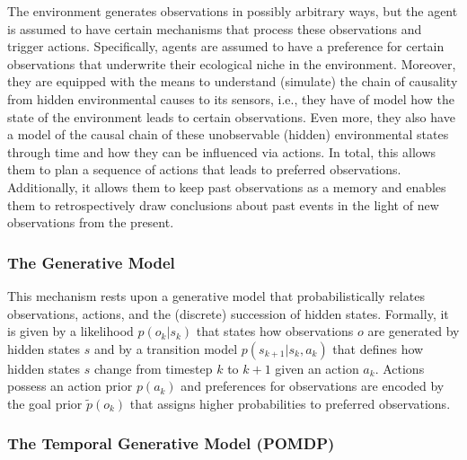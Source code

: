 The environment generates observations in possibly arbitrary ways, but the agent is assumed to have certain mechanisms that process these observations and trigger actions. Specifically, agents are assumed to have a preference for certain observations that underwrite their ecological niche in the environment. Moreover, they are equipped with the means to understand (simulate) the chain of causality from hidden environmental causes to its sensors, i.e., they have of model how the state of the environment leads to certain observations. Even more, they also have a model of the causal chain of these unobservable (hidden) environmental states through time and how they can be influenced via actions. In total, this allows them to plan a sequence of actions that leads to preferred observations. Additionally, it allows them to keep past observations as a memory and enables them to retrospectively draw conclusions about past events in the light of new observations from the present.

\subsubsection{The Generative Model}

This mechanism rests upon a generative model that probabilistically relates observations, actions, and the (discrete) succession of hidden states. Formally, it is given by a likelihood \(p(o_k|s_k)\) that states how observations \(o\) are generated by hidden states \(s\) and by a transition model \(p(s_{k+1}|s_k,a_k)\) that defines how hidden states \(s\) change from timestep \(k\) to \(k+1\) given an action \(a_k\). Actions possess an action prior \(p(a_k)\) and preferences for observations are encoded by the goal prior \(\tilde{p}(o_k)\) that assigns higher probabilities to preferred observations.

\subsubsection{The Temporal Generative Model (POMDP)}

